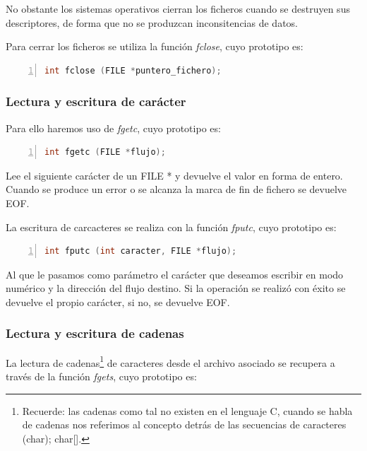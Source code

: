 \documentclass[a4paper, 11pt, titlepage]{article}
\begin{document}
            No obstante los sistemas operativos cierran los ficheros cuando se destruyen sus descriptores, 
            de forma que no se produzcan inconsitencias de datos.

            Para cerrar los ficheros se utiliza la función \textit{fclose}, cuyo prototipo es:

            \begin{lstlisting}[language=C,numbers=left]
    int fclose (FILE *puntero_fichero);\end{lstlisting}
        
        \subsubsection{Lectura y escritura de carácter}

            Para ello haremos uso de \textit{fgetc}, cuyo prototipo es:

            \begin{lstlisting}[language=C,numbers=left]
    int fgetc (FILE *flujo);\end{lstlisting}

            Lee el siguiente carácter de un FILE * y devuelve el valor en forma de entero.
            Cuando se produce un error o se alcanza la marca de fin de fichero se devuelve
            EOF. 

            La escritura de carcacteres se realiza con la función \textit{fputc}, 
            cuyo prototipo es:

            \begin{lstlisting}[language=C,numbers=left]
    int fputc (int caracter, FILE *flujo);\end{lstlisting}
        
            Al que le pasamos como parámetro el carácter que deseamos escribir en 
            modo numérico y la dirección del flujo destino. Si la operación se realizó
            con éxito se devuelve el propio carácter, si no, se devuelve EOF.

        \subsubsection{Lectura y escritura de cadenas}

            La lectura de cadenas\footnote{
                Recuerde: las cadenas como tal no existen en el lenguaje C, cuando se 
                habla de cadenas nos referimos al concepto detrás de las secuencias 
                de caracteres (char); char[].
            } de caracteres desde el archivo asociado se recupera 
            a través de la función \textit{fgets}, cuyo prototipo es:
            
\end{document}
